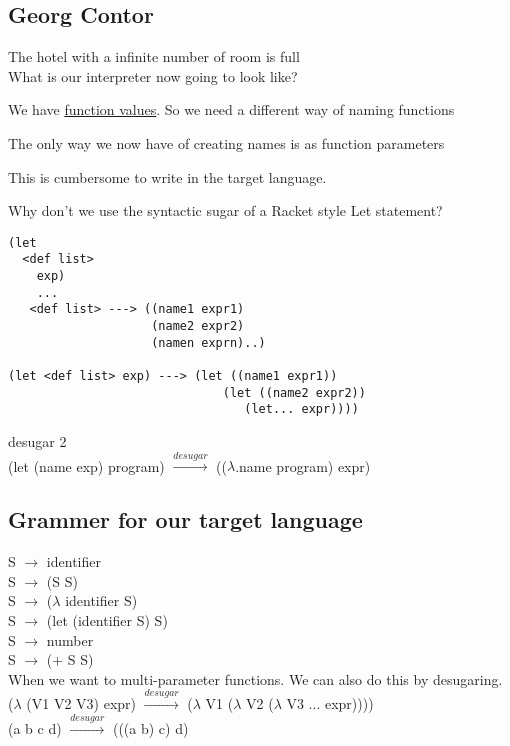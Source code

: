 \documentclass{article}
\begin{document}
\subsection*{Georg Contor}
\begin{flushleft}
The hotel with a infinite number of room is full\\

\doublespacing
What is our interpreter now going to look like?

\doublespacing
We have \underline{function values}. So we need a different way of naming functions

\doublespacing
The only way we now have of creating names is as function parameters

\doublespacing
This is cumbersome to write in the target language.

\doublespacing
Why don't we use the syntactic sugar of a Racket style Let statement?
\begin{verbatim}
(let
  <def list>
    exp)
    ...
   <def list> ---> ((name1 expr1)
                    (name2 expr2)
                    (namen exprn)..)

(let <def list> exp) ---> (let ((name1 expr1))
                              (let ((name2 expr2)) 
                                 (let... expr))))
\end{verbatim}
desugar 2\\
(let (name exp) program) $\xrightarrow{desugar}$ (($\lambda$.name program) expr)
\end{flushleft}

\subsection*{Grammer for our target language}
\begin{flushleft}
S $\rightarrow$ identifier\\
S $\rightarrow$ (S S)\\
S $\rightarrow$ ($\lambda$ identifier S)\\
S $\rightarrow$ (let (identifier S) S)\\
S $\rightarrow$ number\\
S $\rightarrow$ (+ S S)\\

\doublespacing
When we want to multi-parameter functions. We can also do this by desugaring. \\

\doublespacing
($\lambda$ (V1 V2 V3) expr) $\xrightarrow{desugar}$ ($\lambda$ V1 ($\lambda$ V2 ($\lambda$ V3 ... expr))))\\

\doublespacing
(a b c d) $\xrightarrow{desugar}$ (((a b) c) d)
\end{flushleft}
\end{document}
